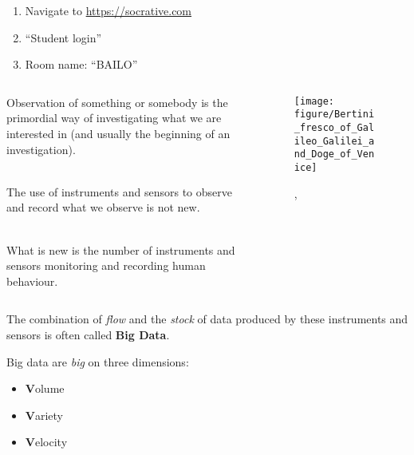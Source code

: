 \documentclass[serif, aspectratio=169]{beamer}
\begin{document}
\begin{frame}

\begin{enumerate}

\item Navigate to {\url{https://socrative.com}}
\item \enquote{Student login}
\item Room name: \enquote{BAILO}

\end{enumerate}

\end{frame}

\begin{frame}

\begin{columns}
\begin{column}{0.4\textwidth}

Observation of something or somebody is the primordial way of investigating what we are interested in (and usually the beginning of an investigation). \\~\

The use of instruments and sensors to observe and record what we observe is not new.  \\~\

What is new is the number of instruments and sensors monitoring and recording human behaviour.


\end{column}
\begin{column}{0.6\textwidth}

\begin{figure}

\texttt{[image: figure/Bertini\_fresco\_of\_Galileo\_Galilei\_and\_Doge\_of\_Venice]}
\caption{\footnotesize{, \cite{bertini_galileo_1858}}}
\end{figure}

\end{column}
\end{columns}

\end{frame}


\begin{frame}

The combination of \textit{flow} and the \textit{stock} of data produced by these instruments and sensors is often called \textbf{Big Data}. 

Big data are \textit{big} on three dimensions: 

\begin{itemize}

\item \textbf{V}olume
\item \textbf{V}ariety
\item \textbf{V}elocity

\end{itemize}

\end{frame}
\end{document}
